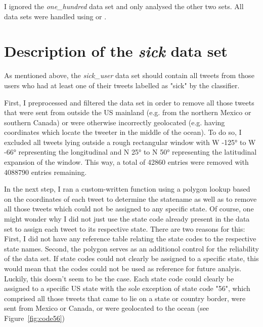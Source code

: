 \documentclass[11pt, a4paper]{report}\usepackage[]{graphicx}\usepackage[]{color}
\begin{document}
I ignored the \textit{one\_hundred} data set and only analysed the other two sets. All data sets were handled using  or .

\section{Description of the \textit{sick} data set}
\label{sec:sick_user_exploratory}



As mentioned above, the \textit{sick\_user} data set should contain all tweets from those users who had at least one of their tweets labelled as "sick" by the classifier.\newline

First, I preprocessed and filtered the data set in order to remove all those tweets that were sent from outside the US mainland (e.g. from the northern Mexico or southern Canada) or were otherwise incorrectly geolocated (e.g. having coordinates which locate the tweeter in the middle of the ocean). To do so, I excluded all tweets lying outside a rough rectangular window with W -125° to W -66° representing the longitudinal and N 25° to N 50° representing the latitudinal expansion of the window. This way, a total of 42860 entries were removed with 4088790 entries remaining.\newline

In the next step, I ran a custom-written function using a polygon lookup based on the coordinates of each tweet to determine the statename as well as to remove all those tweets which could not be assigned to any specific state. Of course, one might wonder why I did not just use the state code already present in the data set to assign each tweet to its respective state. There are two reasons for this: First, I did not have any reference table relating the state codes to the respective state names. Second, the polygon serves as an additionol control for the reliability of the data set. If state codes could not clearly be assigned to a specific state, this would mean that the codes could not be used as reference for future analyis. Luckily, this doesn't seem to be the case. Each state code could clearly be assigned to a specific US state with the sole exception of state code "56", which comprised all those tweets that came to lie on a state or country border, were sent from Mexico or Canada, or were geolocated to the ocean (see Figure~\ref{fig:code56})\newline
\end{document}
